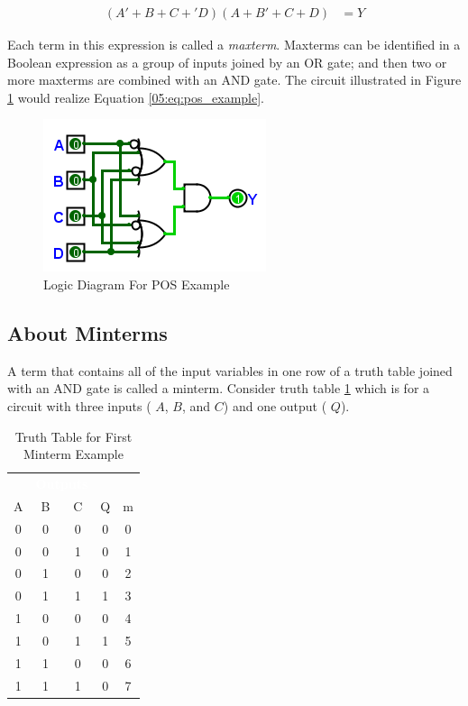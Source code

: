 \begin{align}
  \label{05:eq:pos_example}
  (A'+B+C+'D)(A+B'+C+D) &= Y
\end{align}

Each term in this expression is called a \emph{maxterm}. Maxterms can be identified in a Boolean expression as a group of inputs joined by an \textsf{OR} gate; and then two or more maxterms are combined with an \textsf{AND} gate. The circuit illustrated in Figure \ref{fig:05_03} would realize Equation \ref{05:eq:pos_example}. 

\begin{figure}[H]
	\centering
	\includegraphics[width=\maxwidth{.95\linewidth}]{gfx/05_03}
	\caption{Logic Diagram For POS Example}
	\label{fig:05_03}
\end{figure}

\subsection{About Minterms}
\label{05:subsec:about_minterms}

A term that contains all of the input variables in one row of a truth table joined with an \textsf{AND} gate is called a minterm. Consider truth table \ref{05:tab:truth_table_for_first_minterm_example} which is for a circuit with three inputs ( $ A $,  $ B $, and  $ C $) and one output ( $ Q $).

\begin{table}[H]
  \sffamily
  \newcommand{\head}[1]{\textcolor{white}{\textbf{#1}}}    
  \begin{center}
    \begin{tabular}{ccc|cc} 
      \rowcolor{black!75}
      \multicolumn{3}{c}{\head{Inputs}} & \multicolumn{2}{c}{\head{Outputs}} \\
      A & B & C & Q & m\\
      \hline
      0 & 0 & 0 & 0 & 0 \\
      0 & 0 & 1 & 0 & 1 \\
      0 & 1 & 0 & 0 & 2 \\
      0 & 1 & 1 & 1 & 3 \\
      1 & 0 & 0 & 0 & 4 \\
      1 & 0 & 1 & 1 & 5 \\
      1 & 1 & 0 & 0 & 6 \\
      1 & 1 & 1 & 0 & 7 
    \end{tabular}
  \end{center}
  \caption{Truth Table for First Minterm Example}
  \label{05:tab:truth_table_for_first_minterm_example}
\end{table}

